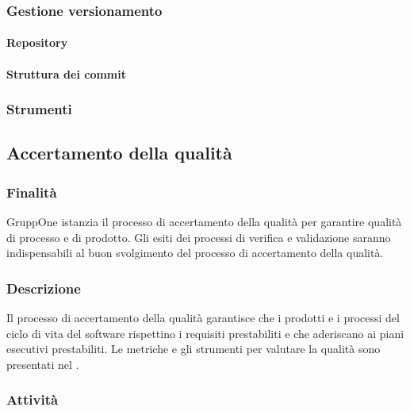 \documentclass[../norme-di-progetto.tex]{subfiles}
\begin{document}
\subsubsection{Gestione versionamento}%
\label{subs:gestione_versionamento}

\paragraph{Repository}%
\label{par:repository}

\paragraph{Struttura dei commit}%
\label{par:struttura_dei_commit}

\subsubsection{Strumenti}%
\label{subs:gestione_della_configurazione/strumenti}

\subsection{Accertamento della qualità}%
\label{subs:accertamento_della_qualita}

\subsubsection{Finalità}%
\label{subs:accertamento_della_qualita/finalita}

GruppOne istanzia il processo di accertamento della qualità per garantire qualità di processo e di prodotto.
Gli esiti dei processi di verifica e validazione saranno indispensabili al buon svolgimento del processo di accertamento della qualità.

\subsubsection{Descrizione}%
\label{subs:accertamento_della_qualita/descrizione}

Il processo di accertamento della qualità garantisce che i prodotti e i processi del ciclo di vita del software rispettino i requisiti prestabiliti e che aderiscano ai piani esecutivi prestabiliti. Le metriche e gli strumenti per valutare la qualità sono presentati nel .

\subsubsection{Attività}%
\label{subs:accertamento_della_qualita/attivita}
\end{document}
